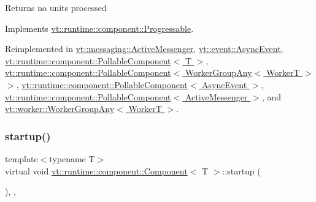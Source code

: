 \begin{DoxyReturn}{Returns}
no units processed 
\end{DoxyReturn}


Implements \hyperlink{structvt_1_1runtime_1_1component_1_1_progressable_a37e883d4822db4f1effa9587b9f1160d}{vt\+::runtime\+::component\+::\+Progressable}.



Reimplemented in \hyperlink{structvt_1_1messaging_1_1_active_messenger_a4cd83c125e144ecbd9425fa7cd194538}{vt\+::messaging\+::\+Active\+Messenger}, \hyperlink{structvt_1_1event_1_1_async_event_a36f18429bc2856a30c8f7fd70654e0a4}{vt\+::event\+::\+Async\+Event}, \hyperlink{structvt_1_1runtime_1_1component_1_1_pollable_component_a34cad810026224d550cd9b0c9d1eff22}{vt\+::runtime\+::component\+::\+Pollable\+Component$<$ T $>$}, \hyperlink{structvt_1_1runtime_1_1component_1_1_pollable_component_a34cad810026224d550cd9b0c9d1eff22}{vt\+::runtime\+::component\+::\+Pollable\+Component$<$ Worker\+Group\+Any$<$ Worker\+T $>$ $>$}, \hyperlink{structvt_1_1runtime_1_1component_1_1_pollable_component_a34cad810026224d550cd9b0c9d1eff22}{vt\+::runtime\+::component\+::\+Pollable\+Component$<$ Async\+Event $>$}, \hyperlink{structvt_1_1runtime_1_1component_1_1_pollable_component_a34cad810026224d550cd9b0c9d1eff22}{vt\+::runtime\+::component\+::\+Pollable\+Component$<$ Active\+Messenger $>$}, and \hyperlink{structvt_1_1worker_1_1_worker_group_any_a1a2d6dc321514501e00c0373f2583146}{vt\+::worker\+::\+Worker\+Group\+Any$<$ Worker\+T $>$}.

\mbox{\label{structvt_1_1runtime_1_1component_1_1_component_aad3974307ab3b2e1df389a91310f68c2}} 
\subsubsection{\texorpdfstring{startup()}{startup()}}
{\footnotesize\ttfamily template$<$typename T$>$ \\
virtual void \hyperlink{structvt_1_1runtime_1_1component_1_1_component}{vt\+::runtime\+::component\+::\+Component}$<$ T $>$\+::startup (\begin{DoxyParamCaption}{ }\end{DoxyParamCaption})\hspace{0.3cm}{\ttfamily [inline]}, {\ttfamily [override]}, {\ttfamily [virtual]}}



